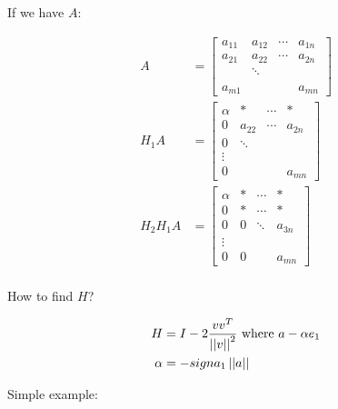 If we have $A$:

\begin{align*}
  A &=
  \begin{bmatrix}
    a_{11} & a_{12} & \cdots & a_{1n} \\
    a_{21} & a_{22} & \cdots & a_{2n} \\
    & \ddots & \\
    \\
    a_{m1} & & & a_{mn}
  \end{bmatrix} \\
  H_1 A &=
  \begin{bmatrix}
    \alpha & * & \cdots & * \\
    0 & a_{22} & \cdots & a_{2n} \\
    0& \ddots & \\
    \vdots\\
    0 & & & a_{mn}
  \end{bmatrix} \\
  H_2 H_1 A &=
  \begin{bmatrix}
    \alpha & * & \cdots & * \\
    0 & * & \cdots & * \\
    0 & 0 & \ddots & a_{3n}\\
    \vdots\\
    0 & 0 & & a_{mn}
  \end{bmatrix} \\
\end{align*}

How to find $H$?

\begin{align*}
  H &= I - 2 {v v^T \over \left|\left|v\right|\right|^2} \text{ where } a - \alpha e_1 \\
  \alpha &= -sign{a_1}\left|\left|a\right|\right|
\end{align*}

Simple example:

